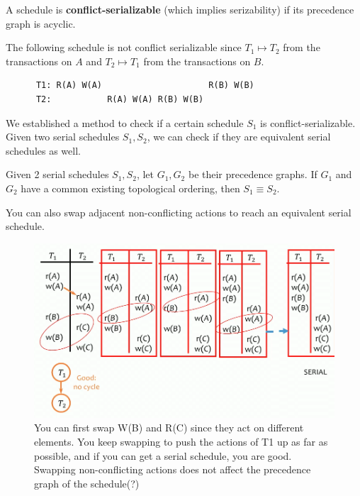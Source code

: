   \begin{theorem}
    A schedule is \textbf{conflict-serializable} (which implies serizability) if its precedence graph is acyclic. 
  \end{theorem} 

  \begin{example}
    The following schedule is not conflict serializable since $T_1 \mapsto T_2$ from the transactions on $A$ and $T_2 \mapsto T_1$ from the transactions on $B$. 
    \begin{lstlisting}
      T1: R(A) W(A)                     R(B) W(B)
      T2:           R(A) W(A) R(B) W(B) 
    \end{lstlisting}
  \end{example}

  We established a method to check if a certain schedule $S_1$ is conflict-serializable. Given two serial schedules $S_1, S_2$, we can check if they are equivalent serial schedules as well. 

  \begin{theorem}
    Given 2 serial schedules $S_1, S_2$, let $G_1, G_2$ be their precedence graphs. If $G_1$ and $G_2$ have a common existing topological ordering, then $S_1 \equiv S_2$. 
  \end{theorem} 

  \begin{theorem}
    You can also swap adjacent non-conflicting actions to reach an equivalent serial schedule. 

    \begin{figure}[H]
      \centering 
      \includegraphics[scale=0.4]{img/swap_serial.png}
      \caption{You can first swap W(B) and R(C) since they act on different elements. You keep swapping to push the actions of T1 up as far as possible, and if you can get a serial schedule, you are good. Swapping non-conflicting actions does not affect the precedence graph of the schedule(?)} 
      \label{fig:swap_serial}
    \end{figure}
  \end{theorem} 

